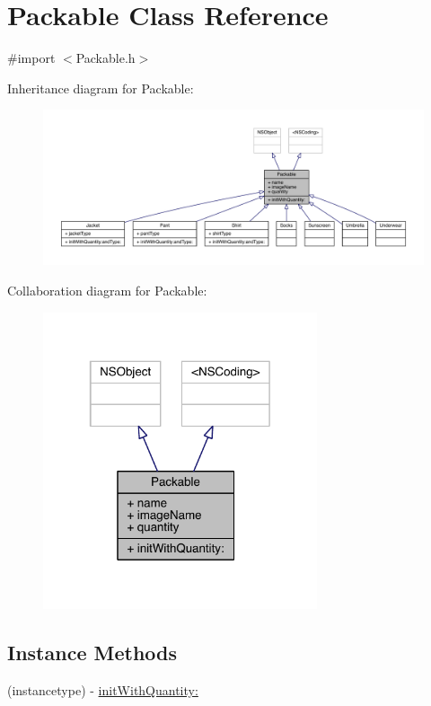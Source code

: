 \hypertarget{interface_packable}{\section{Packable Class Reference}
\label{interface_packable}
}


{\ttfamily \#import $<$Packable.\-h$>$}



Inheritance diagram for Packable\-:\nopagebreak
\begin{figure}[H]
\begin{center}
\leavevmode
\includegraphics[width=350pt]{interface_packable__inherit__graph}
\end{center}
\end{figure}


Collaboration diagram for Packable\-:\nopagebreak
\begin{figure}[H]
\begin{center}
\leavevmode
\includegraphics[width=229pt]{interface_packable__coll__graph}
\end{center}
\end{figure}
\subsection*{Instance Methods}
\begin{DoxyCompactItemize}
\item 
(instancetype) -\/ \hyperlink{interface_packable_a30cc46d60486a458893971e597b9caac}{init\-With\-Quantity\-:}
\end{DoxyCompactItemize}
